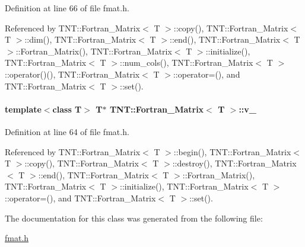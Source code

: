Definition at line 66 of file fmat.h.



Referenced by TNT::Fortran\_\-Matrix$<$ T $>$::copy(), TNT::Fortran\_\-Matrix$<$ T $>$::dim(), TNT::Fortran\_\-Matrix$<$ T $>$::end(), TNT::Fortran\_\-Matrix$<$ T $>$::Fortran\_\-Matrix(), TNT::Fortran\_\-Matrix$<$ T $>$::initialize(), TNT::Fortran\_\-Matrix$<$ T $>$::num\_\-cols(), TNT::Fortran\_\-Matrix$<$ T $>$::operator()(), TNT::Fortran\_\-Matrix$<$ T $>$::operator=(), and TNT::Fortran\_\-Matrix$<$ T $>$::set().

\paragraph[{v\_\-}]{\setlength{\rightskip}{0pt plus 5cm}template$<$class T$>$ T$\ast$ {\bf TNT::Fortran\_\-Matrix}$<$ T $>$::{\bf v\_\-}}\hfill\label{class_t_n_t_1_1_fortran___matrix_abf3d2e67457caba42916d0a3ad6020c7}


Definition at line 64 of file fmat.h.



Referenced by TNT::Fortran\_\-Matrix$<$ T $>$::begin(), TNT::Fortran\_\-Matrix$<$ T $>$::copy(), TNT::Fortran\_\-Matrix$<$ T $>$::destroy(), TNT::Fortran\_\-Matrix$<$ T $>$::end(), TNT::Fortran\_\-Matrix$<$ T $>$::Fortran\_\-Matrix(), TNT::Fortran\_\-Matrix$<$ T $>$::initialize(), TNT::Fortran\_\-Matrix$<$ T $>$::operator=(), and TNT::Fortran\_\-Matrix$<$ T $>$::set().



The documentation for this class was generated from the following file:\begin{DoxyCompactItemize}
\item 
\hyperlink{fmat_8h}{fmat.h}\end{DoxyCompactItemize}

